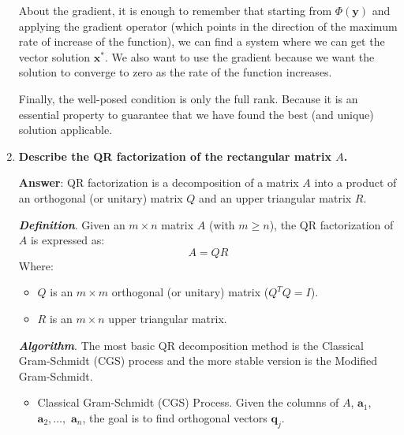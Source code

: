 \begin{enumerate}[label=\textcolor{Green3}{\textbf{\arabic*.}}]
\begin{tipbox}
        \highspace
        About the gradient, it is enough to remember that starting from $\Phi\left(\mathbf{y}\right)$ and applying the gradient operator (which points in the direction of the maximum rate of increase of the function), we can find a system where we can get the vector solution $\mathbf{x}^{*}$. We also want to use the gradient because we want the solution to converge to zero as the rate of the function increases.

        \highspace
        Finally, the well-posed condition is only the full rank. Because it is an essential property to guarantee that we have found the best (and unique) solution applicable.
    \end{tipbox}


    \newpage

    \item \textcolor{Green3}{\textbf{%
        Describe the QR factorization of the rectangular matrix $A$.
    }}

    \textbf{Answer}: QR factorization is a decomposition of a matrix $A$ into a product of an orthogonal (or unitary) matrix $Q$ and an upper triangular matrix $R$.

    \textbf{\emph{Definition}}. Given an $m \times n$ matrix $A$ (with $m \ge n$), the QR factorization of $A$ is expressed as:
    \begin{equation*}
        A = QR
    \end{equation*}
    Where:
    \begin{itemize}
        \item $Q$ is an $m \times m$ orthogonal (or unitary) matrix ($Q^{T} Q = I$).
        \item $R$ is an $m \times n$ upper triangular matrix.
    \end{itemize}
    
    \textbf{\emph{Algorithm}}. The most basic QR decomposition method is the Classical Gram-Schmidt (CGS) process and the more stable version is the Modified Gram-Schmidt.
    \begin{itemize}
        \item Classical Gram-Schmidt (CGS) Process. Given the columns of $A$, $\mathbf{a}_{1}$, $\mathbf{a}_{2}, \dots,$ $\mathbf{a}_{n}$, the goal is to find orthogonal vectors $\mathbf{q}_{j}$.
        

\end{itemize}
\end{enumerate}
